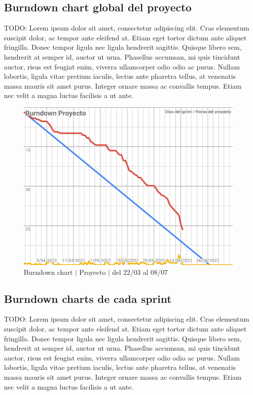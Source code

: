 \subsection{Burndown chart global del proyecto}
TODO: Lorem ipsum dolor sit amet, consectetur adipiscing elit. Cras elementum suscipit dolor, ac tempor ante eleifend at. Etiam eget tortor dictum ante aliquet fringilla. Donec tempor ligula nec ligula hendrerit sagittis. Quisque libero sem, hendrerit at semper id, auctor ut urna. Phasellus accumsan, mi quis tincidunt auctor, risus est feugiat enim, viverra ullamcorper odio odio ac purus. Nullam lobortis, ligula vitae pretium iaculis, lectus ante pharetra tellus, at venenatis massa mauris sit amet purus. Integer ornare massa ac convallis tempus. Etiam nec velit a magna luctus facilisis a ut ante.
\begin{figure}[H]
    \centering
    \includegraphics[width=1\linewidth]{text/image/BurndownChartGlobal.pdf}
    \caption{Burndown chart $|$ Proyecto $|$ del 22/03 al 08/07}
    \label{fig:burndown_chart_proyecto}
\end{figure}

\newpage
\subsection{Burndown charts de cada sprint}
TODO: Lorem ipsum dolor sit amet, consectetur adipiscing elit. Cras elementum suscipit dolor, ac tempor ante eleifend at. Etiam eget tortor dictum ante aliquet fringilla. Donec tempor ligula nec ligula hendrerit sagittis. Quisque libero sem, hendrerit at semper id, auctor ut urna. Phasellus accumsan, mi quis tincidunt auctor, risus est feugiat enim, viverra ullamcorper odio odio ac purus. Nullam lobortis, ligula vitae pretium iaculis, lectus ante pharetra tellus, at venenatis massa mauris sit amet purus. Integer ornare massa ac convallis tempus. Etiam nec velit a magna luctus facilisis a ut ante.


